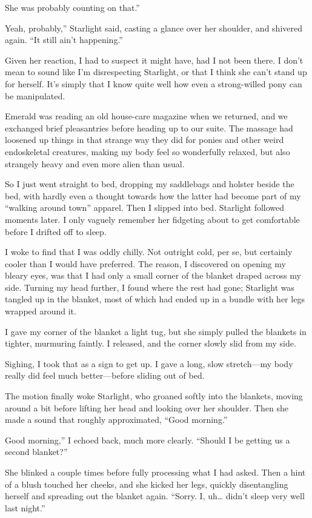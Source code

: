 \leavevmode{}She was probably counting on that.”

\leavevmode{}Yeah, probably,” Starlight said, casting a glance over her shoulder, and shivered again. “It still ain’t happening.”

Given her reaction, I had to suspect it might have, had I not been there. I don’t mean to sound like I’m disrespecting Starlight, or that I think she can’t stand up for herself. It’s simply that I know quite well how even a strong-willed pony can be manipulated.

Emerald was reading an old house-care magazine when we returned, and we exchanged brief pleasantries before heading up to our suite. The massage had loosened up things in that strange way they did for ponies and other weird endoskeletal creatures, making my body feel so wonderfully relaxed, but also strangely heavy and even more alien than usual.

So I just went straight to bed, dropping my saddlebags and holster beside the bed, with hardly even a thought towards how the latter had become part of my “walking around town” apparel. Then I slipped into bed. Starlight followed moments later. I only vaguely remember her fidgeting about to get comfortable before I drifted off to sleep.

{\br}%
I woke to find that I was oddly chilly. Not outright cold, per se, but certainly cooler than I would have preferred. The reason, I discovered on opening my bleary eyes, was that I had only a small corner of the blanket draped across my side. Turning my head further, I found where the rest had gone; Starlight was tangled up in the blanket, most of which had ended up in a bundle with her legs wrapped around it.

I gave my corner of the blanket a light tug, but she simply pulled the blankets in tighter, murmuring faintly. I released, and the corner slowly slid from my side.

Sighing, I took that as a sign to get up. I gave a long, slow stretch—my body really did feel much better—before sliding out of bed.

The motion finally woke Starlight, who groaned softly into the blankets, moving around a bit before lifting her head and looking over her shoulder. Then she made a sound that roughly approximated, “Good morning.”

\leavevmode{}Good morning,” I echoed back, much more clearly. “Should I be getting us a second blanket?”

She blinked a couple times before fully processing what I had asked. Then a hint of a blush touched her cheeks, and she kicked her legs, quickly disentangling herself and spreading out the blanket again. “Sorry. I, uh… didn’t sleep very well last night.”

